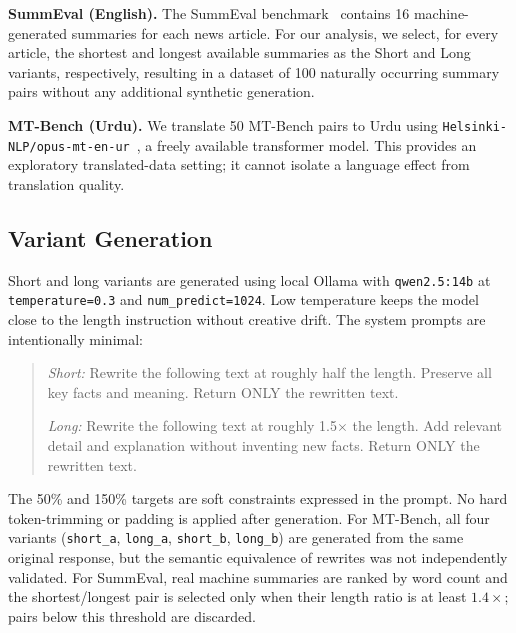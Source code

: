 \documentclass[10pt,conference]{IEEEtran}
\begin{document}
\textbf{SummEval (English).} The SummEval benchmark~\cite{fabbri2021summeval} contains 16 machine-generated summaries for each news article. For our analysis, we select, for every article, the shortest and longest available summaries as the Short and Long variants, respectively, resulting in a dataset of 100 naturally occurring summary pairs without any additional synthetic generation.

\textbf{MT-Bench (Urdu).} We translate 50 MT-Bench pairs to Urdu using \texttt{Helsinki-NLP/opus-mt-en-ur}~\cite{tiedemann2020opus}, a freely available transformer model. This provides an exploratory translated-data setting; it cannot isolate a language effect from translation quality.

\subsection{Variant Generation}
Short and long variants are generated using local Ollama with \texttt{qwen2.5:14b} at \texttt{temperature=0.3} and \texttt{num\_predict=1024}. Low temperature keeps the model close to the length instruction without creative drift. The system prompts are intentionally minimal:

\begin{quote}\small
\textit{Short:} Rewrite the following text at roughly half the length. Preserve all key facts and meaning. Return ONLY the rewritten text.

\textit{Long:} Rewrite the following text at roughly 1.5$\times$ the length. Add relevant detail and explanation without inventing new facts. Return ONLY the rewritten text.
\end{quote}

The 50\% and 150\% targets are soft constraints expressed in the prompt. No hard token-trimming or padding is applied after generation. For MT-Bench, all four variants (\texttt{short\_a}, \texttt{long\_a}, \texttt{short\_b}, \texttt{long\_b}) are generated from the same original response, but the semantic equivalence of rewrites was not independently validated. For SummEval, real machine summaries are ranked by word count and the shortest/longest pair is selected only when their length ratio is at least $1.4\times$; pairs below this threshold are discarded.
\end{document}
